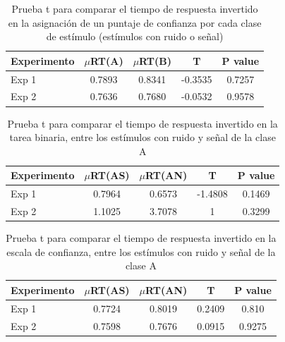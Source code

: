 \begin{table}[h]
\caption[Prueba t para comparar el tiempo de respuesta invertido en la Escala de Confianza por cada clase de estímulo (estímulos con ruido o señal)]{Prueba t para comparar el tiempo de respuesta invertido en la asignación de un puntaje de confianza por cada clase de estímulo (estímulos con ruido o señal)}
\label{Tabla_RT2_AB}
\centering
\begin{tabular}{l |  c c c c}
\toprule
\textbf{Experimento} & \textbf{$\mu$RT(A)} & \textbf{$\mu$RT(B)} & \textbf{T} & \textbf{P value}\\
\midrule
Exp 1 & 0.7893 & 0.8341 & -0.3535 & 0.7257 \\
Exp 2 & 0.7636 & 0.7680 & -0.0532 & 0.9578 \\
\bottomrule
\end{tabular}
\end{table}

\begin{table}[h]
\caption[Prueba t para comparar el tiempo de respuesta invertido en la tarea binaria, entre los estímulos con ruido y señal de la clase A]{Prueba t para comparar el tiempo de respuesta invertido en la tarea binaria, entre los estímulos con ruido y señal de la clase A}
\label{Tabla_RT1_A}
\centering
\begin{tabular}{l |  c c c c}
\toprule
\textbf{Experimento} & \textbf{$\mu$RT(AS)} & \textbf{$\mu$RT(AN)} & \textbf{T} & \textbf{P value}\\
\midrule
Exp 1 & 0.7964 & 0.6573 & -1.4808 & 0.1469 \\
Exp 2 & 1.1025 & 3.7078 & 1 & 0.3299 \\
\bottomrule
\end{tabular}
\end{table}

\begin{table}[h]
\caption[Prueba t para comparar el tiempo de respuesta invertido en la escala de confianza, entre los estímulos con ruido y señal de la clase A]{Prueba t para comparar el tiempo de respuesta invertido en la escala de confianza, entre los estímulos con ruido y señal de la clase A}
\label{Tabla_RT2_A}
\centering
\begin{tabular}{l | c c c c}
\toprule
\textbf{Experimento} & \textbf{$\mu$RT(AS)} & \textbf{$\mu$RT(AN)} & \textbf{T} & \textbf{P value}\\
\midrule
Exp 1 & 0.7724 & 0.8019 & 0.2409 & 0.810 \\
Exp 2 & 0.7598 & 0.7676 & 0.0915 & 0.9275  \\
\bottomrule
\end{tabular}
\end{table}


